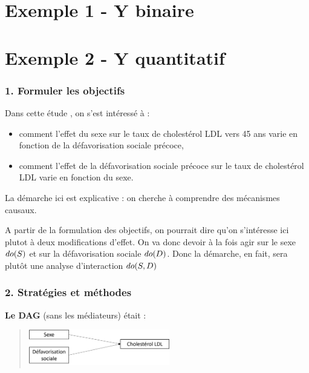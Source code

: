 \documentclass[
]{book}
\providecommand{\tightlist}{%
  \setlength{\itemsep}{0pt}\setlength{\parskip}{0pt}}
\begin{document}
\hypertarget{exemple-1---y-binaire}{%
\chapter{Exemple 1 - Y binaire}\label{exemple-1---y-binaire}}

\hypertarget{exemple-2---y-quantitatif}{%
\chapter{Exemple 2 - Y quantitatif}\label{exemple-2---y-quantitatif}}

\hypertarget{formuler-les-objectifs}{%
\subsection*{1. Formuler les objectifs}\label{formuler-les-objectifs}}

Dans cette étude \citet{colineaux2023explaining}, on s'est intéressé à :

\begin{itemize}
\tightlist
\item
  comment l'effet du sexe sur le taux de cholestérol LDL vers 45 ans varie en fonction de la défavorisation sociale précoce,
\item
  comment l'effet de la défavorisation sociale précoce sur le taux de cholestérol LDL varie en fonction du sexe.
\end{itemize}

La démarche ici est explicative : on cherche à comprendre des mécanismes causaux.

A partir de la formulation des objectifs, on pourrait dire qu'on s'intéresse ici plutot à deux modifications d'effet.
On va donc devoir à la fois agir sur le sexe \(\small do(S)\) et sur la défavorisation sociale \(\small do(D)\).
Donc la démarche, en fait, sera plutôt une analyse d'interaction \(\small do(S,D)\)

\hypertarget{stratuxe9gies-et-muxe9thodes}{%
\subsection*{2. Stratégies et méthodes}\label{stratuxe9gies-et-muxe9thodes}}

\textbf{Le DAG} (sans les médiateurs) était :

\begin{quote}
\includegraphics[width=0.5\textwidth,height=\textheight]{img/Image13.png}
\end{quote}
\end{document}
